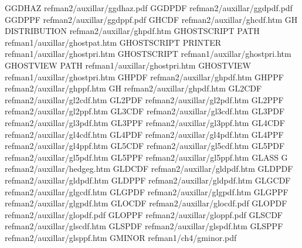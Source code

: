 GGDHAZ                                  refman2/auxillar/ggdhaz.pdf
GGDPDF                                  refman2/auxillar/ggdpdf.pdf
GGDPPF                                  refman2/auxillar/ggdppf.pdf
GHCDF                                   refman2/auxillar/ghcdf.htm
GH DISTRIBUTION                         refman2/auxillar/ghpdf.htm
GHOSTSCRIPT PATH                        refman1/auxillar/ghostpat.htm
GHOSTSCRIPT PRINTER                     refman1/auxillar/ghostpri.htm
GHOSTSCRIPT                             refman1/auxillar/ghostpri.htm
GHOSTVIEW PATH                          refman1/auxillar/ghostpri.htm
GHOSTVIEW                               refman1/auxillar/ghostpri.htm
GHPDF                                   refman2/auxillar/ghpdf.htm
GHPPF                                   refman2/auxillar/ghppf.htm
GH                                      refman2/auxillar/ghpdf.htm
GL2CDF                                  refman2/auxillar/gl2cdf.htm
GL2PDF                                  refman2/auxillar/gl2pdf.htm
GL2PPF                                  refman2/auxillar/gl2ppf.htm
GL3CDF                                  refman2/auxillar/gl3cdf.htm
GL3PDF                                  refman2/auxillar/gl3pdf.htm
GL3PPF                                  refman2/auxillar/gl3ppf.htm
GL4CDF                                  refman2/auxillar/gl4cdf.htm
GL4PDF                                  refman2/auxillar/gl4pdf.htm
GL4PPF                                  refman2/auxillar/gl4ppf.htm
GL5CDF                                  refman2/auxillar/gl5cdf.htm
GL5PDF                                  refman2/auxillar/gl5pdf.htm
GL5PPF                                  refman2/auxillar/gl5ppf.htm
GLASS G                                 refman2/auxillar/hedgeg.htm
GLDCDF                                  refman2/auxillar/gldpdf.htm
GLDPDF                                  refman2/auxillar/gldpdf.htm
GLDPPF                                  refman2/auxillar/gldpdf.htm
GLGCDF                                  refman2/auxillar/glgcdf.htm
GLGPDF                                  refman2/auxillar/glgpdf.htm
GLGPPF                                  refman2/auxillar/glgpdf.htm
GLOCDF                                  refman2/auxillar/glocdf.pdf
GLOPDF                                  refman2/auxillar/glopdf.pdf
GLOPPF                                  refman2/auxillar/gloppf.pdf
GLSCDF                                  refman2/auxillar/glscdf.htm
GLSPDF                                  refman2/auxillar/glspdf.htm
GLSPPF                                  refman2/auxillar/glsppf.htm
GMINOR                                  refman1/ch4/gminor.pdf
